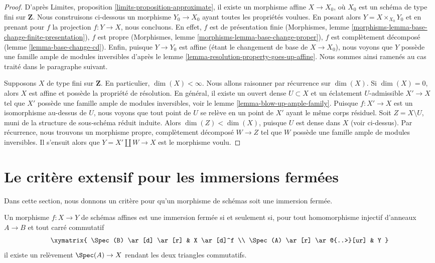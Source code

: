 \begin{proof}
D'après Limites, proposition \ref{limits-proposition-approximate},
il existe un morphisme affine $X \to X_0$, où $X_0$
est un schéma de type fini sur $\mathbf{Z}$. Nous construisons ci-dessous
un morphisme $Y_0 \to X_0$ ayant toutes les propriétés voulues.
En posant alors $Y = X \times_{X_0} Y_0$ et en prenant pour $f$
la projection $f : Y \to X$, nous concluons.
En effet, $f$ est de présentation finie
(Morphismes, lemme \ref{morphisms-lemma-base-change-finite-presentation}),
$f$ est propre
(Morphismes, lemme \ref{morphisms-lemma-base-change-proper}),
$f$ est complètement décomposé
(lemme \ref{lemma-base-change-cd}). Enfin, puisque $Y \to Y_0$ est
affine (étant le changement de base de $X \to X_0$), nous voyons que $Y$ possède
une famille ample de modules inversibles d'après le
lemme \ref{lemma-resolution-property-goes-up-affine}.
Nous sommes ainsi ramenés au cas traité dans le paragraphe suivant.

\medskip\noindent
Supposons $X$ de type fini sur $\mathbf{Z}$. En particulier,
$\dim(X) < \infty$. Nous allons raisonner par récurrence sur $\dim(X)$.
Si $\dim(X) = 0$, alors $X$ est affine et possède la propriété de résolution.
En général, il existe un ouvert dense $U \subset X$ et un
éclatement $U$-admissible $X' \to X$ tel que $X'$ possède
une famille ample de modules inversibles, voir
le lemme \ref{lemma-blow-up-ample-family}.
Puisque $f : X' \to X$ est un isomorphisme au-dessus de $U$,
nous voyons que tout point de $U$ se relève en un point de $X'$
ayant le même corps résiduel.
Soit $Z = X \setminus U$, muni de la structure de sous-schéma réduit induite.
Alors $\dim(Z) < \dim(X)$, puisque $U$ est dense dans $X$ (voir ci-dessus).
Par récurrence, nous trouvons un morphisme propre, complètement décomposé
$W \to Z$ tel que $W$ possède une famille ample de modules inversibles.
Il s'ensuit alors que $Y = X' \amalg W \to X$ est le morphisme
voulu.
\end{proof}




\section{Le critère extensif pour les immersions fermées}
\label{section-extensive-criterion-closed-immersions}

\noindent
Dans cette section, nous donnons un critère pour qu'un morphisme de schémas 
soit une immersion fermée.

\begin{lemma}
\label{lemma-affine-extensive-criterion}
Un morphisme $f : X \to Y$ de schémas affines est une immersion fermée 
si et seulement si, pour tout homomorphisme injectif d'anneaux $A \to B$ et tout 
carré commutatif
$$
\xymatrix{
\Spec(B) \ar[d] \ar[r] & X \ar[d]^f \\
\Spec(A) \ar[r] \ar@{..>}[ur] & Y
}
$$
il existe un relèvement $\Spec(A) \to X$ rendant les deux triangles commutatifs.
\end{lemma}

